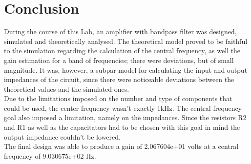 \section{Conclusion}
\label{sec:conclusion} 
During the course of this Lab, an amplifier with bandpass filter was designed, simulated and theoretically analysed. The theoretical model proved to be faithful to the simulation regarding the calculation of the central frequency, as well the gain estimation for a band of frequencies; there were deviations, but of small magnitude. It was, however, a subpar model for calculating the input and output impedances of the circuit, since there were noticeable deviations between the theoretical values and the simulated ones.\\
Due to the limitations imposed on the number and type of components that could be used, the center frequency wasn't exactly 1kHz. The central frequency goal also imposed a limitation, namely on the impedances. Since the resistors R2 and R1 as well as the capacitators had to be chosen with this goal in mind the output impedance couldn't be lowered.\\
The final design was able to produce a gain of 2.067604e+01 volts at a central frequency of 9.030675e+02 Hz.\\
